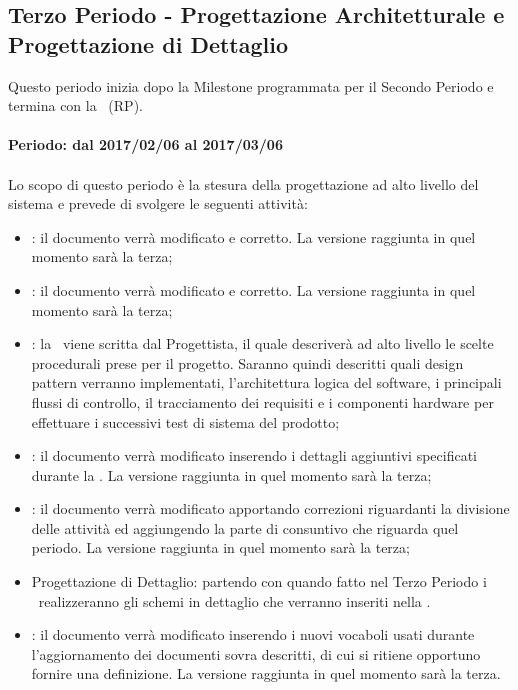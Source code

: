 \documentclass[../PianoDiProgetto_v3.0.0.tex]{subfiles}
\begin{document}
	\subsection{Terzo Periodo - Progettazione Architetturale e Progettazione di Dettaglio}
	Questo periodo inizia dopo la Milestone programmata per il Secondo Periodo e termina con la \revisionediprogettazione\ (RP).
	\\
	\\
	\textbf{Periodo: dal 2017/02/06 al 2017/03/06}
	\\
	\\
	Lo scopo di questo periodo è la stesura della progettazione ad alto livello del sistema e prevede di svolgere le seguenti attività:
	\begin{itemize}
		\item \normediprogetto: il documento verrà modificato e corretto. La versione raggiunta in quel momento sarà la terza;
		\item \analisideirequisiti: il documento verrà modificato e corretto. La versione raggiunta in quel momento sarà la terza;
		\item {}: la \ viene scritta dal Progettista, il quale descriverà ad alto livello le scelte procedurali prese per il progetto. Saranno quindi descritti quali design pattern verranno implementati, l'architettura logica del software, i principali flussi di controllo, il tracciamento dei requisiti e i componenti hardware per effettuare i successivi test di sistema del prodotto;
		\item \pianodiqualifica: il documento verrà modificato inserendo i dettagli aggiuntivi specificati durante la \revisionedeirequisiti. La versione raggiunta in quel momento sarà la terza;
		\item \pianodiprogetto: il documento verrà modificato apportando correzioni riguardanti la divisione delle attività ed aggiungendo la parte di consuntivo che riguarda quel periodo. La versione raggiunta in quel momento sarà la terza;
		\item Progettazione di Dettaglio: partendo con quando fatto nel Terzo Periodo i \progettisti\ realizzeranno gli schemi in dettaglio che verranno inseriti nella \specificatecnica.
		\item \glossario: il documento verrà modificato inserendo i nuovi vocaboli usati durante l'aggiornamento dei documenti sovra descritti, di cui si ritiene opportuno fornire una definizione. La versione raggiunta in quel momento sarà la terza.
	\end{itemize}
\end{document}

